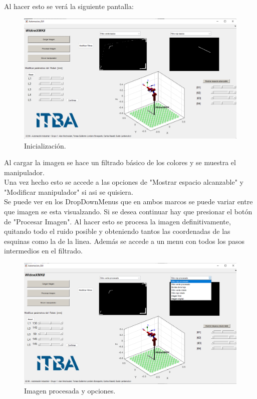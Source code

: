Al hacer esto se verá la siguiente pantalla:
\begin{figure}[H]
	\centering
	\includegraphics[width=\linewidth]{init}
	\caption{Inicializaci\'on.}	
	\label{fig:Inicializacion}
\end{figure}
Al cargar la imagen se hace un filtrado b\'asico de los colores y se muestra el manipulador.\\
Una vez hecho esto se accede a las opciones de "Mostrar espacio alcanzable" y "Modificar manipulador" si asi se quisiera.\\
Se puede ver en los DropDownMenus que en ambos marcos se puede variar entre que imagen se esta visualzando.
Si se desea continuar hay que presionar el bot\'on de "Procesar Imagen". Al hacer esto se procesa la imagen definitivamente, quitando todo el ruido posible y obteniendo tantos las coordenadas de las esquinas como la de la linea.
Adem\'as se accede a un menu con todos los pasos intermedios en el filtrado.
\begin{figure}[H]
	\centering
	\includegraphics[width=\linewidth]{ddm}
	\caption{Imagen procesada y opciones.}	
	\label{fig:ddm}
\end{figure}
